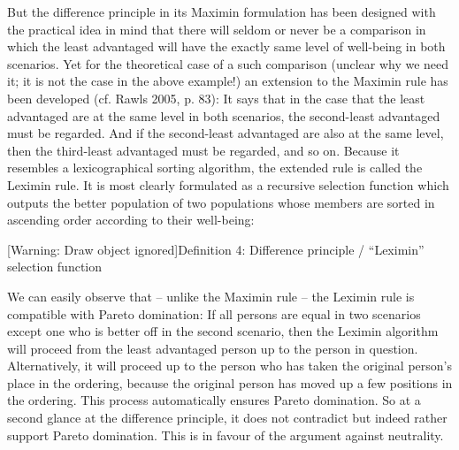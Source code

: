 But the difference principle in its Maximin formulation has been designed with the practical idea in mind that there will seldom or never be a comparison in which the least advantaged will have the exactly same level of well-being in both scenarios. Yet for the theoretical case of a such comparison (unclear why we need it; it is not the case in the above example!) an extension to the Maximin rule has been developed (cf. \label{ref:RNDsnmRiHk1LE}Rawls 2005, p. 83): It says that in the case that the least advantaged are at the same level in both scenarios, the second-least advantaged must be regarded. And if the second-least advantaged are also at the same level, then the third-least advantaged must be regarded, and so on. Because it resembles a lexicographical sorting algorithm, the extended rule is called the Leximin rule. It is most clearly formulated as a recursive selection function which outputs the better population of two populations whose members are sorted in ascending order according to their well-being:  

[Warning: Draw object ignored]Definition 4: Difference principle / “Leximin” selection function  
\begin{comment}
\begin{flushleft} \tablefirsthead{} \tablehead{} \tabletail{} \tablelasttail{} \begin{supertabular}{m{1.546cm}m{1.8369999cm}m{1.0439999cm}m{0.274cm}m{3.9009998cm}m{5.4370003cm}} ~  & ~  & ~  & ~  & u(s1) {\textgreater} u(t1) & \{S\}\\ lexiMin( & S=s1...sn, 

T=t1...tn & ) = & ~  & u(t1) {\textgreater} u(s1) & \{T\}\\  &  &  & ~  & S = T = ${\emptyset}$ & \{S, T\}\\ \multicolumn{2}{m{3.583cm}}{with: 

u(s1) ${\leq}$ … ${\leq}$ u(sn) u(t1) \ ${\leq}$ … ${\leq}$ u(tn)} & ~  & ~  & u(t1) = u(s1) & lexiMin(s2...sn, t2...tn)\\ \end{supertabular} \end{flushleft} 
\end{comment}
\bigskip 

We can easily observe that – unlike the Maximin rule – the Leximin rule is compatible with Pareto domination: If all persons are equal in two scenarios except one who is better off in the second scenario, then the Leximin algorithm will proceed from the least advantaged person up to the person in question. Alternatively, it will proceed up to the person who has taken the original person’s place in the ordering, because the original person has moved up a few positions in the ordering. This process automatically ensures Pareto domination. So at a second glance at the difference principle, it does not contradict but indeed rather support Pareto domination. This is in favour of the argument against neutrality.  

